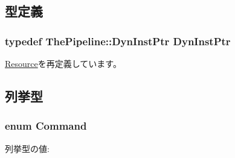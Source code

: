 \subsection{型定義}
\hypertarget{classBranchPredictor_af9d0c8a46736ba6aa2d8bb94da1a5e73}{
\subsubsection[{DynInstPtr}]{\setlength{\rightskip}{0pt plus 5cm}typedef {\bf ThePipeline::DynInstPtr} {\bf DynInstPtr}}}
\label{classBranchPredictor_af9d0c8a46736ba6aa2d8bb94da1a5e73}


\hyperlink{classResource_af9d0c8a46736ba6aa2d8bb94da1a5e73}{Resource}を再定義しています。

\subsection{列挙型}
\hypertarget{classBranchPredictor_a2afce0a47a93eee73a314d53e4890153}{
\subsubsection[{Command}]{\setlength{\rightskip}{0pt plus 5cm}enum {\bf Command}}}
\label{classBranchPredictor_a2afce0a47a93eee73a314d53e4890153}
\begin{Desc}
\item[列挙型の値: ]\par
\begin{description}
\item[{\em 
\hypertarget{classBranchPredictor_a2afce0a47a93eee73a314d53e4890153aec1c2cbeee4201814af6c741b088b95e}{
PredictBranch}
\label{classBranchPredictor_a2afce0a47a93eee73a314d53e4890153aec1c2cbeee4201814af6c741b088b95e}
}]\item[{\em 
\hypertarget{classBranchPredictor_a2afce0a47a93eee73a314d53e4890153a246fdcc5483f7878e46d4f5d80789b16}{
UpdatePredictor}
\label{classBranchPredictor_a2afce0a47a93eee73a314d53e4890153a246fdcc5483f7878e46d4f5d80789b16}
}]\end{description}
\end{Desc}




